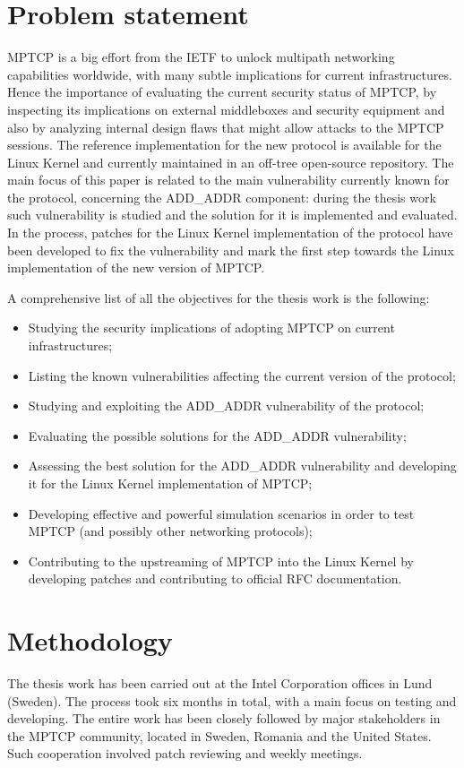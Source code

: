 \section{Problem statement}
MPTCP is a big effort from the IETF to unlock multipath networking capabilities worldwide, with many subtle implications for current infrastructures. Hence the importance of evaluating the current security status of MPTCP, by inspecting its implications on external middleboxes and security equipment and also by analyzing internal design flaws that might allow attacks to the MPTCP sessions. 
The reference implementation for the new protocol is available for the Linux Kernel and currently maintained in an off-tree open-source repository.
The main focus of this paper is related to the main vulnerability currently known for the protocol, concerning the ADD\_ADDR component: during the thesis work such vulnerability is studied and the solution for it is implemented and evaluated. In the process, patches for the Linux Kernel implementation of the protocol have been developed to fix the vulnerability and mark the first step towards the Linux implementation of the new version of MPTCP. 

A comprehensive list of all the objectives for the thesis work is the following:
\begin{itemize}
    \item Studying the security implications of adopting MPTCP on current infrastructures; 
    \item Listing the known vulnerabilities affecting the current version of the protocol; 
    \item Studying and exploiting the ADD\_ADDR vulnerability of the protocol;
    \item Evaluating the possible solutions for the ADD\_ADDR vulnerability; 
    \item Assessing the best solution for the ADD\_ADDR vulnerability and developing it for the Linux Kernel implementation of MPTCP;
    \item Developing effective and powerful simulation scenarios in order to test MPTCP (and possibly other networking protocols);
    \item Contributing to the upstreaming of MPTCP into the Linux Kernel by developing patches and contributing to official RFC documentation.
\end{itemize}

\section{Methodology}
The thesis work has been carried out at the Intel Corporation offices in Lund (Sweden). The process took six months in total, with a main focus on testing and developing. The entire work has been closely followed by major stakeholders in the MPTCP community, located in Sweden, Romania and the United States. Such cooperation involved patch reviewing and weekly meetings.

